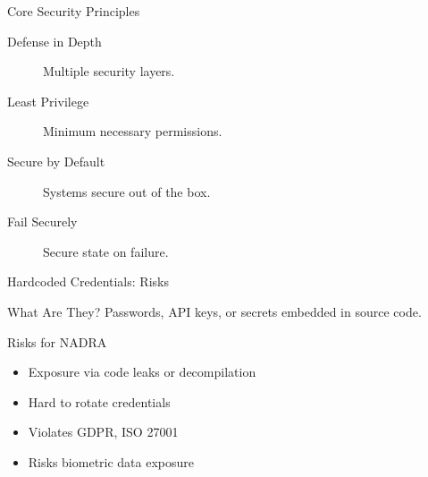 \documentclass[12pt]{beamer}
\begin{document}
\begin{frame}{Core Security Principles}
  \begin{description}
    \item[Defense in Depth] Multiple security layers.
    \item[Least Privilege] Minimum necessary permissions.
    \item[Secure by Default] Systems secure out of the box.
    \item[Fail Securely] Secure state on failure.
  \end{description}
\end{frame}

\begin{frame}{Hardcoded Credentials: Risks}
  \begin{block}{What Are They?}
    Passwords, API keys, or secrets embedded in source code.
  \end{block}
  \begin{alertblock}{Risks for NADRA}
    \begin{itemize}
      \item Exposure via code leaks or decompilation
      \item Hard to rotate credentials
      \item Violates GDPR, ISO 27001
      \item Risks biometric data exposure
    \end{itemize}
  \end{alertblock}
\end{frame}
\end{document}
